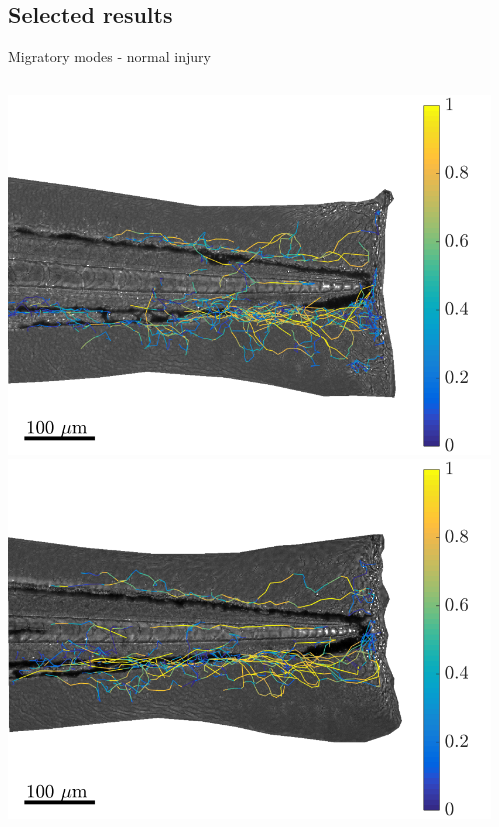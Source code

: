 \documentclass[mathserif,11pt]{beamer}
\begin{document}
\subsection{Selected results}
\begin{frame}{Migratory modes - normal injury}
\begin{columns}
	\begin{column}{0.31\textwidth}
		\vspace{-0.2cm}
		\includegraphics[scale=0.19]{Figures/mode1_fish1.png}\vfil
		\vspace{0.2cm}
		\includegraphics[scale=0.19]{Figures/mode1_fish3.png}
	\end{column}
	\begin{column}{0.31\textwidth}

\end{column}
\end{columns}
\end{frame}
\end{document}
